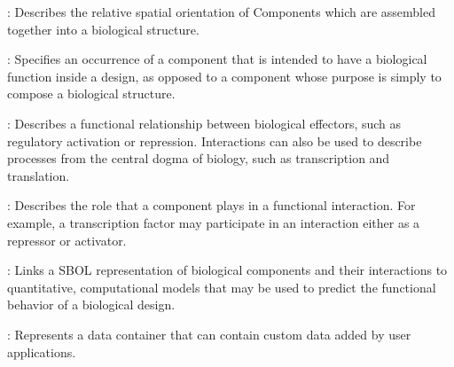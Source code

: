\begin{description}
\item \emph{}:
Describes the relative spatial orientation of Components which are assembled together into a biological structure.

\item \emph{}:
Specifies an occurrence of a component that is intended to have a biological function inside a design, as opposed to a component whose purpose is simply to compose a biological structure. 

\item \emph{}:
Describes a functional relationship between biological effectors, such as regulatory activation or repression.  Interactions can also be used to describe processes from the central dogma of biology, such as transcription and translation.

\item \emph{}:
Describes the role that a component plays in a functional interaction.  For example, a transcription factor may participate in an interaction either as a repressor or activator.

\item \emph{}:
Links a SBOL representation of biological components and their interactions to quantitative, computational models that may be used to predict the functional behavior of a biological design.

\item \emph{}:
Represents a data container that can contain custom data added by user applications.
\end{description}

